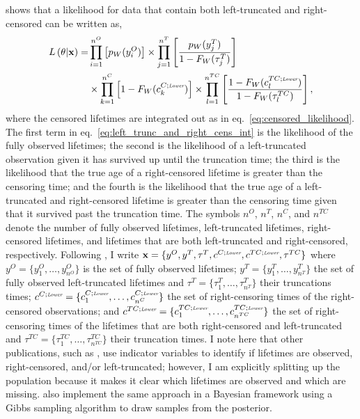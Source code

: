 \citet[eq.~(1)]{hong2009} shows that a likelihood for data that contain both left-truncated and right-censored can be written as,
\begin{align}
    \label{eq:left_trunc_and_right_cens_int}
    L\left(\theta|\hbox{\textbf{x}}\right) = & 
    \prod^{n^O}_{i = 1}\left[p_W(y^O_i) \right] \times
    \prod^{n^T}_{j = 1}\left[\frac{p_W(y^T_j)}{1 - F_W(\tau^T_j)} \right] \\
    & \times \prod^{n^C}_{k = 1}\left[1 - F_W(c^{C;\textit{\tiny{Lower}}}_k)\right]
    \times \prod^{n^{TC}}_{l = 1}\left[\frac{1 - F_W(c^{TC; \textit{\tiny{Lower}}}_l)}{1 - F_W(\tau^{TC}_l)}\right] \nonumber,
\end{align}
where the censored lifetimes are integrated out as in eq.~\eqref{eq:censored_likelihood}. The first term in eq.~\eqref{eq:left_trunc_and_right_cens_int} is the likelihood of the fully observed lifetimes; the second is the likelihood of a left-truncated observation given it has survived up until the truncation time; the third is the likelihood that the true age of a right-censored lifetime is greater than the censoring time; and the fourth is the likelihood that the true age of a left-truncated and right-censored lifetime is greater than the censoring time given that it survived past the truncation time. The symbols $n^O$, $n^T$, $n^C$, and $n^{TC}$ denote the number of fully observed lifetimes, left-truncated lifetimes, right-censored lifetimes, and lifetimes that are both left-truncated and right-censored, respectively. Following \citet{hong2009}, I write $\textbf{x} = \{y^O, y^T, \tau^T, c^{C;\textit{\tiny{Lower}}}, c^{TC;\textit{\tiny{Lower}}}, \tau^{TC}\}$ where $y^O = \{y^O_1, \dots, y^O_{n^O}\}$ is the set of fully observed lifetimes; $y^T = \{y^T_1, \dots, y^T_{n^T}\}$ the set of fully observed left-truncated lifetimes and $\tau^T = \{\tau^T_1, \dots, \tau^T_{n^T}\}$ their truncations times; $c^{C;\textit{\tiny{Lower}}} = \{c^{C;\textit{\tiny{Lower}}}_1, \dots, c^{C;\textit{\tiny{Lower}}}_{n^C}\}$ the set of right-censoring times of the right-censored observations; and $c^{TC;\textit{\tiny{Lower}}} = \{c^{TC;\textit{\tiny{Lower}}}_1, \dots, c^{TC;\textit{\tiny{Lower}}}_{n^{TC}}\}$ the set of right-censoring times of the lifetimes that are both right-censored and left-truncated and $\tau^{TC} = \{\tau^{TC}_1, \dots, \tau^{TC}_{n^{TC}}\}$ their truncation times. I note here that other publications, such as \citet{hong2009}, use indicator variables to identify if lifetimes are observed, right-censored, and/or left-truncated; however, I am explicitly splitting up the population because it makes it clear which lifetimes are observed and which are missing. \citet{kundu2016} also implement the same approach in a Bayesian framework using a Gibbs sampling algorithm to draw samples from the posterior.

